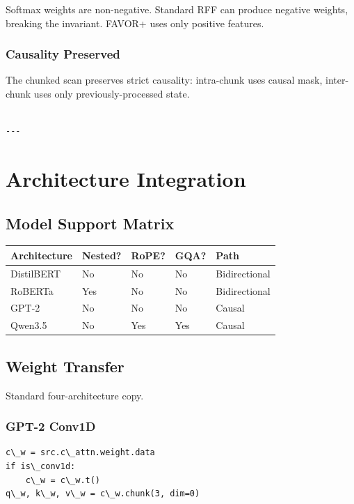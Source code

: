 Softmax weights are non-negative. Standard RFF can produce negative 
weights, breaking the invariant. FAVOR+ uses only positive features.

\subsubsection{Causality Preserved}

The chunked scan preserves strict causality: intra-chunk uses causal mask, 
inter-chunk uses only previously-processed state.
\begin{lstlisting}

---
\end{lstlisting}


\section{Architecture Integration}

\subsection{Model Support Matrix}

\begin{table}[H]
\centering
\small
\begin{tabular}{lllll}
\toprule
\textbf{Architecture} & \textbf{Nested?} & \textbf{RoPE?} & \textbf{GQA?} & \textbf{Path} \\
\midrule
DistilBERT & No & No & No & Bidirectional \\
RoBERTa & Yes & No & No & Bidirectional \\
GPT-2 & No & No & No & Causal \\
Qwen3.5 & No & Yes & Yes & Causal \\
\bottomrule
\end{tabular}
\end{table}

\subsection{Weight Transfer}

Standard four-architecture copy.

\subsubsection{GPT-2 Conv1D}

\begin{lstlisting}
c\_w = src.c\_attn.weight.data
if is\_conv1d:
    c\_w = c\_w.t()
q\_w, k\_w, v\_w = c\_w.chunk(3, dim=0)
\end{lstlisting}

